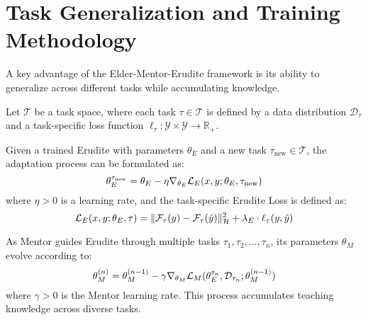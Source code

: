 \section{Task Generalization and Training Methodology}

A key advantage of the Elder-Mentor-Erudite framework is its ability to generalize across different tasks while accumulating knowledge.

\begin{definition}
Let $\mathcal{T}$ be a task space, where each task $\tau \in \mathcal{T}$ is defined by a data distribution $\mathcal{D}_\tau$ and a task-specific loss function $\ell_\tau: \mathcal{Y} \times \mathcal{Y} \rightarrow \mathbb{R}_+$.
\end{definition}

\begin{theorem}
Given a trained Erudite with parameters $\theta_E$ and a new task $\tau_{\text{new}} \in \mathcal{T}$, the adaptation process can be formulated as:
\begin{equation}
\theta_E^{\tau_{\text{new}}} = \theta_E - \eta \nabla_{\theta_E} \mathcal{L}_E(x, y; \theta_E, \tau_{\text{new}})
\end{equation}
where $\eta > 0$ is a learning rate, and the task-specific Erudite Loss is defined as:
\begin{equation}
\mathcal{L}_E(x, y; \theta_E, \tau) = \| \mathcal{F}_\tau(y) - \mathcal{F}_\tau(\hat{y}) \|_{\mathcal{H}}^2 + \lambda_E \cdot \ell_\tau(y, \hat{y})
\end{equation}
\end{theorem}

\begin{proposition}
As Mentor guides Erudite through multiple tasks $\tau_1, \tau_2, \ldots, \tau_n$, its parameters $\theta_M$ evolve according to:
\begin{equation}
\theta_M^{(n)} = \theta_M^{(n-1)} - \gamma \nabla_{\theta_M} \mathcal{L}_M(\theta_E^{\tau_n}, \mathcal{D}_{\tau_n}; \theta_M^{(n-1)})
\end{equation}
where $\gamma > 0$ is the Mentor learning rate. This process accumulates teaching knowledge across diverse tasks.
\end{proposition}

